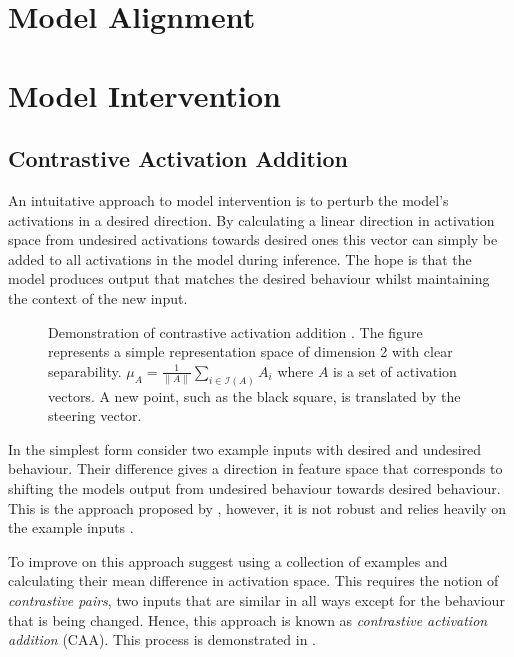 \section{Model Alignment}

\section{Model Intervention}

\subsection{Contrastive Activation Addition}
\label{caa}

An intuitative approach to model intervention is to perturb the model's activations in a desired direction.
By calculating a linear direction in activation space from undesired activations towards desired ones this vector can simply be added to all activations in the model during inference.
The hope is that the model produces output that matches the desired behaviour whilst maintaining the context of the new input.

\begin{figure}
    \centering
    \captionsetup{width=.9\textwidth}
    
\caption{Demonstration of contrastive activation addition \cite{caa}. The figure represents a simple representation space of dimension 2 with clear separability. $\mu_A = \frac{1}{\|A\|}\sum_{i \in \mathcal{I}(A)} A_i$ where $A$ is a set of activation vectors. A new point, such as the black square, is translated by the steering vector.}
    \label{fig:caa}
\end{figure}

In the simplest form consider two example inputs with desired and undesired behaviour.
Their difference gives a direction in feature space that corresponds to shifting the models output from undesired behaviour towards desired behaviour.
This is the approach proposed by \citet{activation-addition}, however, it is not robust and relies heavily on the example inputs \cite{caa}.

To improve on this approach \citet{caa} suggest using a collection of examples and calculating their mean difference in activation space.
This requires the notion of \textit{contrastive pairs}, two inputs that are similar in all ways except for the behaviour that is being changed.
Hence, this approach is known as \textit{contrastive activation addition} (CAA).
This process is demonstrated in .

